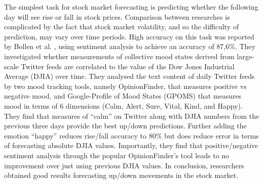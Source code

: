 \documentclass[]{book}
\begin{document}
The simplest task for stock market forecasting is predicting whether the
following day will see rise or fall in stock prices. Comparison between
researches is complicated by the fact that stock market volatility, and
so the difficulty of prediction, may vary over time periods. High
accuracy on this task was reported by Bollen et al.
\citep{bollen2011twitter}, using sentiment analysis to achieve an
accuracy of 87,6\%. They investigated whether measurements of collective
mood states derived from large-scale Twitter feeds are correlated to the
value of the Dow Jones Industrial Average (DJIA) over time. They
analysed the text content of daily Twitter feeds by two mood tracking
tools, namely OpinionFinder, that measures positive vs negative mood,
and Google-Profile of Mood States (GPOMS) that measures mood in terms of
6 dimensions (Calm, Alert, Sure, Vital, Kind, and Happy). They find that
measures of ``calm'' on Twitter along with DJIA numbers from the
previous three days provide the best up/down predictions. Further adding
the emotion ``happy'' reduces rise/fall accuracy to 80\% but does reduce
error in terms of forecasting absolute DJIA values. Importantly, they
find that positive/negative sentiment analysis through the popular
OpinionFinder's tool leads to no improvement over just using previous
DJIA values. In conclusion, researchers obtained good results
forecasting up/down movements in the stock market.
\end{document}
